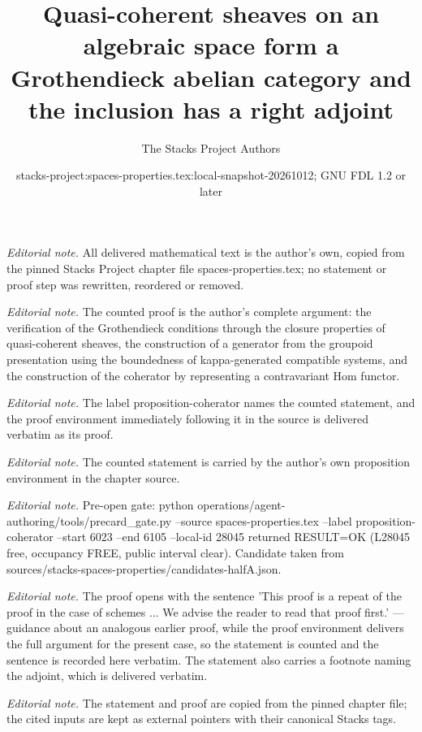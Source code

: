 \documentclass[10pt,a4paper]{amsart}
\title{Quasi-coherent sheaves on an algebraic space form a Grothendieck abelian category and the inclusion has a right adjoint}
\author{The Stacks Project Authors}
\date{stacks-project:spaces-properties.tex:local-snapshot-20261012; GNU FDL 1.2 or later}
\theoremstyle{plain}
\theoremstyle{definition}
\theoremstyle{remark}
\numberwithin{equation}{subsection}
\begin{document}
\maketitle
\noindent\textit{Editorial note.} All delivered mathematical text is the author's own, copied from the pinned Stacks Project chapter file spaces-properties.tex; no statement or proof step was rewritten, reordered or removed.\par\medskip
\noindent\textit{Editorial note.} The counted proof is the author's complete argument: the verification of the Grothendieck conditions through the closure properties of quasi-coherent sheaves, the construction of a generator from the groupoid presentation using the boundedness of kappa-generated compatible systems, and the construction of the coherator by representing a contravariant Hom functor.\par\medskip
\noindent\textit{Editorial note.} The label proposition-coherator names the counted statement, and the proof environment immediately following it in the source is delivered verbatim as its proof.\par\medskip
\noindent\textit{Editorial note.} The counted statement is carried by the author's own proposition environment in the chapter source.\par\medskip
\noindent\textit{Editorial note.} Pre-open gate: python operations/agent-authoring/tools/precard\_gate.py --source spaces-properties.tex --label proposition-coherator --start 6023 --end 6105 --local-id 28045 returned RESULT=OK (L28045 free, occupancy FREE, public interval clear). Candidate taken from sources/stacks-spaces-properties/candidates-halfA.json.\par\medskip
\noindent\textit{Editorial note.} The proof opens with the sentence 'This proof is a repeat of the proof in the case of schemes ... We advise the reader to read that proof first.' — guidance about an analogous earlier proof, while the proof environment delivers the full argument for the present case, so the statement is counted and the sentence is recorded here verbatim. The statement also carries a footnote naming the adjoint, which is delivered verbatim.\par\medskip
\noindent\textit{Editorial note.} The statement and proof are copied from the pinned chapter file; the cited inputs are kept as external pointers with their canonical Stacks tags.\par\medskip
\end{document}
